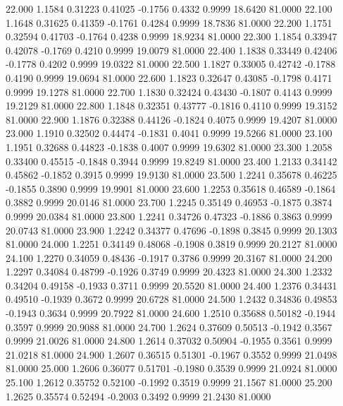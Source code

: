   22.000   1.1584   0.31223   0.41025  -0.1756   0.4332   0.9999  18.6420  81.0000
  22.100   1.1648   0.31625   0.41359  -0.1761   0.4284   0.9999  18.7836  81.0000
  22.200   1.1751   0.32594   0.41703  -0.1764   0.4238   0.9999  18.9234  81.0000
  22.300   1.1854   0.33947   0.42078  -0.1769   0.4210   0.9999  19.0079  81.0000
  22.400   1.1838   0.33449   0.42406  -0.1778   0.4202   0.9999  19.0322  81.0000
  22.500   1.1827   0.33005   0.42742  -0.1788   0.4190   0.9999  19.0694  81.0000
  22.600   1.1823   0.32647   0.43085  -0.1798   0.4171   0.9999  19.1278  81.0000
  22.700   1.1830   0.32424   0.43430  -0.1807   0.4143   0.9999  19.2129  81.0000
  22.800   1.1848   0.32351   0.43777  -0.1816   0.4110   0.9999  19.3152  81.0000
  22.900   1.1876   0.32388   0.44126  -0.1824   0.4075   0.9999  19.4207  81.0000
  23.000   1.1910   0.32502   0.44474  -0.1831   0.4041   0.9999  19.5266  81.0000
  23.100   1.1951   0.32688   0.44823  -0.1838   0.4007   0.9999  19.6302  81.0000
  23.300   1.2058   0.33400   0.45515  -0.1848   0.3944   0.9999  19.8249  81.0000
  23.400   1.2133   0.34142   0.45862  -0.1852   0.3915   0.9999  19.9130  81.0000
  23.500   1.2241   0.35678   0.46225  -0.1855   0.3890   0.9999  19.9901  81.0000
  23.600   1.2253   0.35618   0.46589  -0.1864   0.3882   0.9999  20.0146  81.0000
  23.700   1.2245   0.35149   0.46953  -0.1875   0.3874   0.9999  20.0384  81.0000
  23.800   1.2241   0.34726   0.47323  -0.1886   0.3863   0.9999  20.0743  81.0000
  23.900   1.2242   0.34377   0.47696  -0.1898   0.3845   0.9999  20.1303  81.0000
  24.000   1.2251   0.34149   0.48068  -0.1908   0.3819   0.9999  20.2127  81.0000
  24.100   1.2270   0.34059   0.48436  -0.1917   0.3786   0.9999  20.3167  81.0000
  24.200   1.2297   0.34084   0.48799  -0.1926   0.3749   0.9999  20.4323  81.0000
  24.300   1.2332   0.34204   0.49158  -0.1933   0.3711   0.9999  20.5520  81.0000
  24.400   1.2376   0.34431   0.49510  -0.1939   0.3672   0.9999  20.6728  81.0000
  24.500   1.2432   0.34836   0.49853  -0.1943   0.3634   0.9999  20.7922  81.0000
  24.600   1.2510   0.35688   0.50182  -0.1944   0.3597   0.9999  20.9088  81.0000
  24.700   1.2624   0.37609   0.50513  -0.1942   0.3567   0.9999  21.0026  81.0000
  24.800   1.2614   0.37032   0.50904  -0.1955   0.3561   0.9999  21.0218  81.0000
  24.900   1.2607   0.36515   0.51301  -0.1967   0.3552   0.9999  21.0498  81.0000
  25.000   1.2606   0.36077   0.51701  -0.1980   0.3539   0.9999  21.0924  81.0000
  25.100   1.2612   0.35752   0.52100  -0.1992   0.3519   0.9999  21.1567  81.0000
  25.200   1.2625   0.35574   0.52494  -0.2003   0.3492   0.9999  21.2430  81.0000
